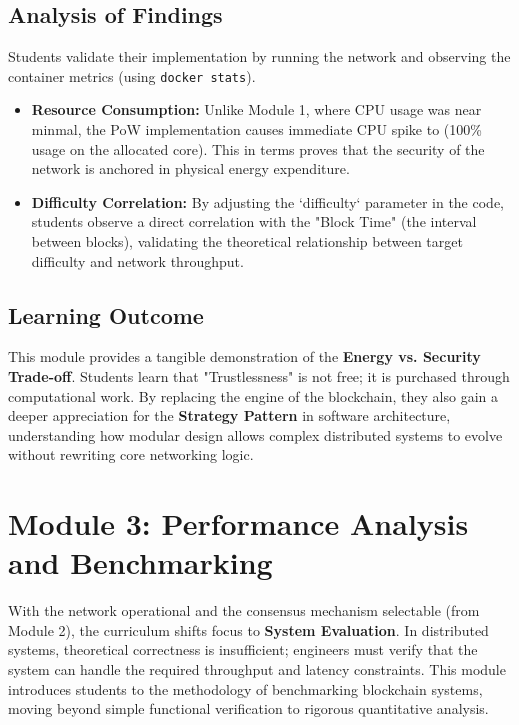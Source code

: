 \subsection{Analysis of Findings}
Students validate their implementation by running the network and observing the container metrics (using \texttt{docker stats}).

\begin{itemize}
    \item \textbf{Resource Consumption:} Unlike Module 1, where CPU usage was near minmal, the PoW implementation causes immediate CPU spike to (100\% usage on the allocated core). This in terms proves that the security of the network is anchored in physical energy expenditure.
    \item \textbf{Difficulty Correlation:} By adjusting the `difficulty` parameter in the code, students observe a direct correlation with the "Block Time" (the interval between blocks), validating the theoretical relationship between target difficulty and network throughput.
\end{itemize}

\subsection{Learning Outcome}
This module provides a tangible demonstration of the \textbf{Energy vs. Security Trade-off}. Students learn that "Trustlessness" is not free; it is purchased through computational work. By replacing the engine of the blockchain, they also gain a deeper appreciation for the \textbf{Strategy Pattern} in software architecture, understanding how modular design allows complex distributed systems to evolve without rewriting core networking logic.

\newpage

\section{Module 3: Performance Analysis and Benchmarking} \label{ch5_module3}

With the network operational and the consensus mechanism selectable (from Module 2), the curriculum shifts focus to \textbf{System Evaluation}. In distributed systems, theoretical correctness is insufficient; engineers must verify that the system can handle the required throughput and latency constraints. This module introduces students to the methodology of benchmarking blockchain systems, moving beyond simple functional verification to rigorous quantitative analysis.

